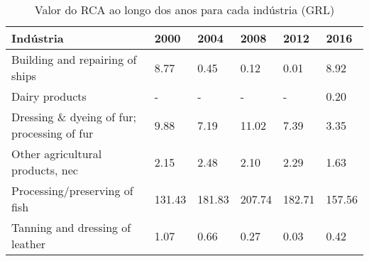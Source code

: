 \begin{table}
\centering
\caption{Valor do RCA ao longo dos anos para cada indústria (GRL)}
\label{tab:ex3-tempo-GRL}
\begin{tabular}{p{6cm}p{1.5cm}p{1.5cm}p{1.5cm}p{1.5cm}p{1.5cm}}
\toprule
                                  Indústria &   2000 &   2004 &   2008 &   2012 &   2016 \\
\midrule
            Building and repairing of ships &   8.77 &   0.45 &   0.12 &   0.01 &   8.92 \\
                             Dairy products &      - &      - &      - &      - &   0.20 \\
Dressing \& dyeing of fur; processing of fur &   9.88 &   7.19 &  11.02 &   7.39 &   3.35 \\
           Other agricultural products, nec &   2.15 &   2.48 &   2.10 &   2.29 &   1.63 \\
              Processing/preserving of fish & 131.43 & 181.83 & 207.74 & 182.71 & 157.56 \\
            Tanning and dressing of leather &   1.07 &   0.66 &   0.27 &   0.03 &   0.42 \\
\bottomrule
\end{tabular}
\end{table}

